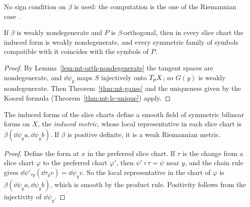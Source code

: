 No sign condition on $\beta$ is used: the computation is the one of the Riemannian case
\cite[\S10.1.1]{Lar22}.

\begin{theorem}
  \label{thm:mt-projector-levi-civita}
  \leanok
  If $\beta$ is weakly nondegenerate and $P$ is $\beta$-orthogonal, then in every slice chart the
  induced form is weakly nondegenerate, and every symmetric family of symbols compatible with it
  coincides with the symbols of $P$.
\end{theorem}

\begin{proof}
  \leanok
  By Lemma~\ref{lem:mt-orth-nondegenerate} the tangent spaces are nondegenerate, and
  $\dd\psi_y$ maps $S$ injectively onto $T_p X$; so $G(y)$ is weakly nondegenerate. Then
  Theorem~\ref{thm:mt-gauss} and the uniqueness given by the Koszul formula
  (Theorem~\ref{thm:mt-lc-unique}) apply.
\end{proof}

\begin{theorem}
  \label{thm:mt-induced-metric}
  \leanok
  The induced forms of the slice charts define a smooth field of symmetric bilinear forms on $X$,
  the \emph{induced metric}, whose local representative in each slice chart is
  $\beta(\dd\psi_y a, \dd\psi_y b)$. If $\beta$ is positive definite, it is a weak Riemannian
  metric.
\end{theorem}

\begin{proof}
  \leanok
  Define the form at $x$ in the preferred slice chart. If $\tau$ is the change from a slice chart
  $\varphi$ to the preferred chart $\varphi'$, then $\psi' \circ \tau = \psi$ near $y$, and the
  chain rule gives $\dd\psi'_{\tau y}(\dd\tau_y v) = \dd\psi_y v$. So the local representative
  in the chart of $\varphi$ is $\beta(\dd\psi_y a, \dd\psi_y b)$, which is smooth by the product
  rule. Positivity follows from the injectivity of $\dd\psi_y$.
\end{proof}


